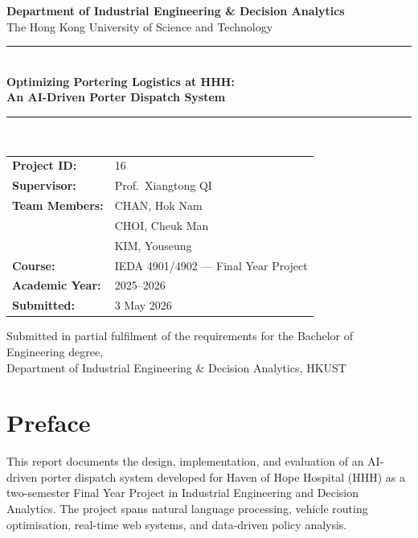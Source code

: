 \documentclass[12pt,a4paper]{article}
\begin{document}

\begin{titlepage}
\centering
\vspace*{1.5cm}

{\Large \textbf{Department of Industrial Engineering \& Decision Analytics}}\\[0.3cm]
{\large The Hong Kong University of Science and Technology}\\[1.8cm]

\rule{\linewidth}{0.8pt}\\[0.5cm]
{\LARGE \textbf{Optimizing Portering Logistics at HHH:}}\\[0.3cm]
{\LARGE \textbf{An AI-Driven Porter Dispatch System}}\\[0.5cm]
\rule{\linewidth}{0.8pt}\\[1.8cm]

\begin{tabular}{ll}
\textbf{Project ID:}    & 16 \\[0.4cm]
\textbf{Supervisor:}    & Prof.\ Xiangtong QI \\[0.4cm]
\textbf{Team Members:}  & CHAN, Hok Nam \\
                        & CHOI, Cheuk Man \\
                        & KIM, Youseung \\[0.4cm]
\textbf{Course:}        & IEDA 4901/4902 --- Final Year Project \\[0.4cm]
\textbf{Academic Year:} & 2025--2026 \\[0.4cm]
\textbf{Submitted:}     & 3 May 2026\\
\end{tabular}

\vfill
{\small Submitted in partial fulfilment of the requirements for the Bachelor of Engineering degree,\\
Department of Industrial Engineering \& Decision Analytics, HKUST}
\end{titlepage}

\newpage
\section*{Preface}

This report documents the design, implementation, and evaluation of an AI-driven porter dispatch system developed for Haven of Hope Hospital (HHH) as a two-semester Final Year Project in Industrial Engineering and Decision Analytics. The project spans natural language processing, vehicle routing optimisation, real-time web systems, and data-driven policy analysis.
\end{document}
